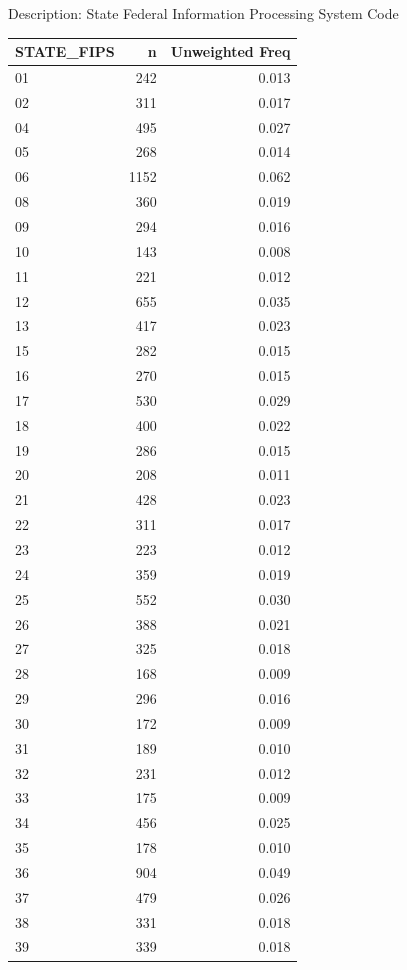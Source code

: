 \documentclass[
]{krantz}
\begin{document}
Description: State Federal Information Processing System Code

\begin{tabular}[t]{l|r|r}
\hline
STATE\_FIPS & n & Unweighted Freq\\
\hline
01 & 242 & 0.013\\
\hline
02 & 311 & 0.017\\
\hline
04 & 495 & 0.027\\
\hline
05 & 268 & 0.014\\
\hline
06 & 1152 & 0.062\\
\hline
08 & 360 & 0.019\\
\hline
09 & 294 & 0.016\\
\hline
10 & 143 & 0.008\\
\hline
11 & 221 & 0.012\\
\hline
12 & 655 & 0.035\\
\hline
13 & 417 & 0.023\\
\hline
15 & 282 & 0.015\\
\hline
16 & 270 & 0.015\\
\hline
17 & 530 & 0.029\\
\hline
18 & 400 & 0.022\\
\hline
19 & 286 & 0.015\\
\hline
20 & 208 & 0.011\\
\hline
21 & 428 & 0.023\\
\hline
22 & 311 & 0.017\\
\hline
23 & 223 & 0.012\\
\hline
24 & 359 & 0.019\\
\hline
25 & 552 & 0.030\\
\hline
26 & 388 & 0.021\\
\hline
27 & 325 & 0.018\\
\hline
28 & 168 & 0.009\\
\hline
29 & 296 & 0.016\\
\hline
30 & 172 & 0.009\\
\hline
31 & 189 & 0.010\\
\hline
32 & 231 & 0.012\\
\hline
33 & 175 & 0.009\\
\hline
34 & 456 & 0.025\\
\hline
35 & 178 & 0.010\\
\hline
36 & 904 & 0.049\\
\hline
37 & 479 & 0.026\\
\hline
38 & 331 & 0.018\\
\hline
39 & 339 & 0.018\\

\end{tabular}
\end{document}
